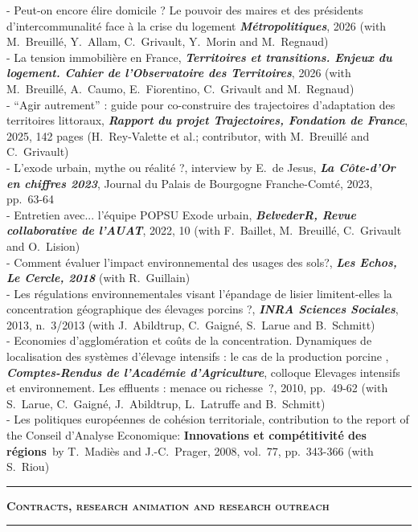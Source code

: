\documentclass[a4paper,12pt]{article}
\newcommand{\titre}[1]{%
	\bigskip
	\noindent \rule[2mm]{\textwidth}{0.5pt}
	\textbf{\textsc{\large #1}} \\
	\noindent \rule[1mm]{\textwidth}{0.5pt}
	}
\begin{document}
\noindent - Peut-on encore élire domicile ? Le pouvoir des maires et des présidents d'intercommunalité face à la crise du logement \textit{\textbf{Métropolitiques}}, 2026 (with M.~Breuillé, Y.~Allam, C.~Grivault, Y.~Morin and M.~Regnaud) \\
- La tension immobilière en France, \textit{\textbf{Territoires et transitions. Enjeux du logement. Cahier de l'Observatoire des Territoires}}, 2026 (with M.~Breuillé, A.~Caumo, E.~Fiorentino, C.~Grivault and M.~Regnaud) \\
- ``Agir autrement'' : guide pour co-construire des trajectoires d'adaptation des territoires littoraux, \textit{\textbf{Rapport du projet Trajectoires, Fondation de France}}, 2025, 142 pages (H.~Rey-Valette et al.; contributor, with M.~Breuillé and C.~Grivault) \\
- L'exode urbain, mythe ou réalité ?, interview by E.~de Jesus, \textit{\textbf{La Côte-d'Or en chiffres 2023}}, Journal du Palais de Bourgogne Franche-Comté, 2023, pp.~63-64 \\
- Entretien avec... l'équipe POPSU Exode urbain, \textit{\textbf{BelvederR, Revue collaborative de l'AUAT}}, 2022, 10 (with F.~Baillet, M.~Breuillé, C.~Grivault and O.~Lision) \\
- Comment évaluer l'impact environnemental des usages des sols?, \textit{\textbf{Les Echos, Le Cercle, 2018}} (with R.~Guillain) \\
- Les régulations environnementales visant l'épandage de lisier limitent-elles la concentration géographique des élevages porcins ?, \textit{\textbf{INRA Sciences Sociales}}, 2013, n.~3/2013 (with J.~Abildtrup, C.~Gaigné, S.~Larue and B.~Schmitt) \\
- Economies d'agglomération et coûts de la concentration. Dynamiques de localisation des systèmes d'élevage intensifs : le cas de la production porcine , \textit{\textbf{Comptes-Rendus de l'Académie d'Agriculture}}, colloque Elevages intensifs et environnement. Les effluents : menace ou richesse~?, 2010, pp.~49-62 (with S.~Larue, C.~Gaigné, J.~Abildtrup, L.~Latruffe and B.~Schmitt) \\
- Les politiques européennes de cohésion territoriale, contribution to the report of the Conseil d'Analyse Economique: \og\textbf{Innovations et compétitivité des régions}\fg~by T.~Madiès and J.-C.~Prager, 2008, vol.~77, pp.~343-366 (with S.~Riou) \\


\titre{Contracts, research animation and research outreach}
\end{document}
